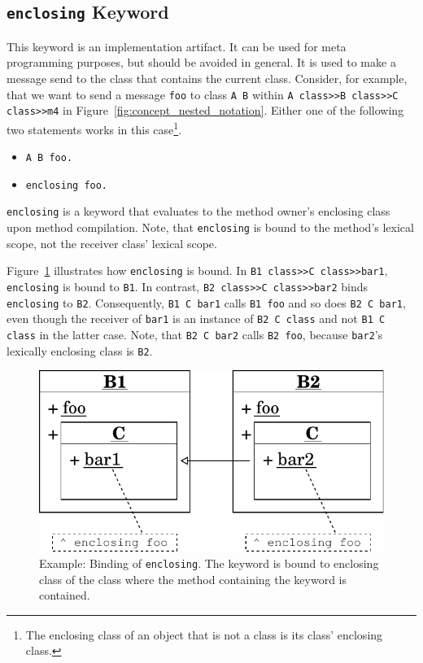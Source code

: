 \subsection{\texttt{enclosing} Keyword}
This keyword is an implementation artifact. It can be used for meta programming purposes, but should be avoided in general. It is used to make a message send to the class that contains the current class. Consider, for example, that we want to send a message \texttt{foo} to class \texttt{A B} within \texttt{A class>>B class>>C class>>m4} in Figure~\ref{fig:concept_nested_notation}. Either one of the following two statements works in this case\footnote{The enclosing class of an object that is not a class is its class' enclosing class.}.

\begin{itemize}
	\item \texttt{A B foo.}
	\item \texttt{enclosing foo.}
\end{itemize}

\texttt{enclosing} is a keyword that evaluates to the method owner's enclosing class upon method compilation. Note, that \texttt{enclosing} is bound to the method's lexical scope, not the receiver class' lexical scope.

Figure~\ref{fig:concept_lexical_thisouter} illustrates how \texttt{enclosing} is bound. In \texttt{B1 class>>C class>>bar1}, \texttt{enclosing} is bound to \texttt{B1}. In contrast, \texttt{B2 class>>C class>>bar2} binds \texttt{enclosing} to \texttt{B2}. Consequently, \texttt{B1 C bar1} calls \texttt{B1 foo} and so does \texttt{B2 C bar1}, even though the receiver of \texttt{bar1} is an instance of \texttt{B2 C class} and not \texttt{B1 C class} in the latter case. Note, that \texttt{B2 C bar2} calls \texttt{B2 foo}, because \texttt{bar2}'s lexically enclosing class is \texttt{B2}.

\begin{figure}[!htp]
	\includegraphics[scale=0.75]{nested_lexical1.pdf}
	\centering
	\caption[Example: Binding of \texttt{enclosing}]{Example: Binding of \texttt{enclosing}. The keyword is bound to enclosing class of the class where the method containing the keyword is contained.}
	\label{fig:concept_lexical_thisouter}
\end{figure}

